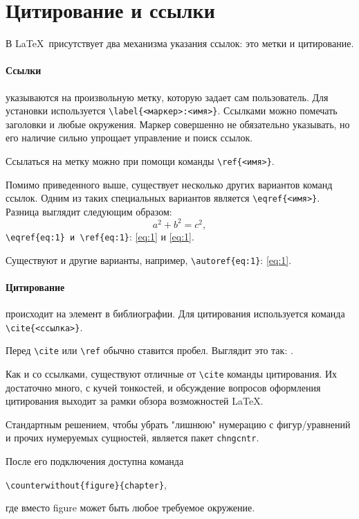 
\section{Цитирование и ссылки}
В \LaTeX~присутствует два механизма указания ссылок: это метки и цитирование. 

\paragraph{Ссылки} указываются на произвольную метку, которую задает сам пользователь. Для установки используется \verb+\label{<маркер>:<имя>}+. Ссылками можно помечать заголовки и любые окружения. 
Маркер совершенно не обязательно указывать, но его наличие сильно упрощает управление и поиск ссылок. 

Ссылаться на метку можно при помощи команды \verb+\ref{<имя>}+.

Помимо приведенного выше, существует несколько других вариантов команд ссылок. Одним из таких специальных вариантов является \verb+\eqref{<имя>}+. Разница выглядит следующим образом:
\begin{equation}\label{eq:1}
    a^2+b^2=c^2, 
\end{equation}
\verb+\eqref{eq:1} и \ref{eq:1}+: \eqref{eq:1} и \ref{eq:1}.

Существуют и другие варианты, например, \verb+\autoref{eq:1}+: \autoref{eq:1}.

\paragraph{Цитирование} происходит на элемент в библиографии. Для цитирования используется команда \verb+\cite{<ссылка>}+. 

Перед \verb+\cite+ или \verb+\ref+ обычно ставится пробел. Выглядит это так: \cite{test}.

Как и со ссылками, существуют отличные от \verb+\cite+ команды цитирования. Их достаточно много, с кучей тонкостей, и обсуждение вопросов оформления цитирования выходит за рамки обзора возможностей \LaTeX.

Стандартным решением, чтобы убрать "лишнюю" нумерацию с фигур/уравнений и прочих нумеруемых сущностей, является пакет \verb+chngcntr+. 

После его подключения доступна команда
\begin{center}
    \verb+\counterwithout{figure}{chapter}+,
\end{center}
где вместо figure может быть любое требуемое окружение.
